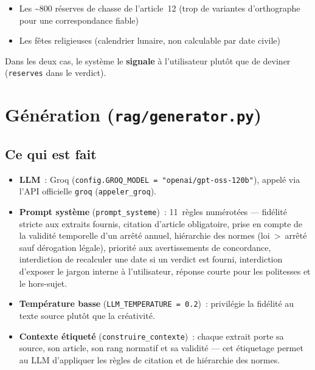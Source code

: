 \documentclass[11pt]{article}
\begin{document}
\begin{itemize}
  \item Les \textasciitilde800 réserves de chasse de l'article~12 (trop de variantes
        d'orthographe pour une correspondance fiable)
  \item Les fêtes religieuses (calendrier lunaire, non calculable par date civile)
\end{itemize}

Dans les deux cas, le système le \textbf{signale} à l'utilisateur plutôt que de deviner
(\texttt{reserves} dans le verdict).

\section{Génération (\texttt{rag/generator.py})}

\subsection*{Ce qui est fait}

\begin{itemize}
  \item \textbf{LLM}~: Groq (\texttt{config.GROQ\_MODEL = "openai/gpt-oss-120b"}), appelé via
        l'API officielle \texttt{groq} (\texttt{appeler\_groq}).
  \item \textbf{Prompt système} (\texttt{prompt\_systeme})~: 11~règles numérotées --- fidélité
        stricte aux extraits fournis, citation d'article obligatoire, prise en compte de la
        validité temporelle d'un arrêté annuel, hiérarchie des normes (loi~>~arrêté sauf
        dérogation légale), priorité aux avertissements de concordance, interdiction de recalculer
        une date si un verdict est fourni, interdiction d'exposer le jargon interne à
        l'utilisateur, réponse courte pour les politesses et le hors-sujet.
  \item \textbf{Température basse} (\texttt{LLM\_TEMPERATURE = 0.2})~: privilégie la fidélité au
        texte source plutôt que la créativité.
  \item \textbf{Contexte étiqueté} (\texttt{construire\_contexte})~: chaque extrait porte sa
        source, son article, son rang normatif et sa validité --- cet étiquetage permet au LLM
        d'appliquer les règles de citation et de hiérarchie des normes.
\end{itemize}
\end{document}
